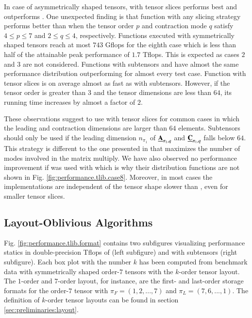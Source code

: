 In case of asymmetrically shaped tensors,  with tensor slices performs best and outperforms .
One unexpected finding is that function  with any slicing strategy performs better than  when the tensor order $p$ and contraction mode $q$ satisfy $4 \leq p \leq 7$ and $2 \leq q \leq 4$, respectively.
Functions executed with symmetrically shaped tensors reach at most $743$ Gflops for the eighth case which is less than half of the attainable peak performance of $1.7$ Tflops.
This is expected as cases $2$ and $3$ are not considered.
Functions  with subtensors and  have almost the same performance distribution outperforming  for almost every test case.
Function  with tensor slices is on average almost as fast as with subtensors.
However, if the tensor order is greater than $3$ and the tensor dimensions are less than $64$, its running time increases by almost a factor of $2$.

These observations suggest to use  with tensor slices for common cases in which the leading and contraction dimensions are larger than $64$ elements.
Subtensors should only be used if the leading dimension $n_{\pi_1}$ of $\underline{\mathbf{A}}_{\pi_1,q}$ and $\underline{\mathbf{C}}_{\pi_1,q}$ falls below $64$.
This strategy is different to the one presented in \cite{li:2015:input} that maximizes the number of modes involved in the matrix multiply.
We have also observed no performance improvement if  was used with  which is why their distribution functions are not shown in Fig. \ref{fig:performance.tlib.case8}.
Moreover, in most cases the  implementations are independent of the tensor shape slower than , even for smaller tensor slices.
\vspace{-1em}

\subsection{Layout-Oblivious Algorithms}
Fig. \ref{fig:performance.tlib.format} contains two subfigures visualizing performance statics in double-precision Tflops of  (left subfigure) and  with subtensors (right subfigure).
Each box plot with the number $k$ has been computed from benchmark data with symmetrically shaped order-$7$ tensors with the $k$-order tensor layout.
The $1$-order and $7$-order layout, for instance, are the first- and last-order storage formats for the order-$7$ tensor with $\pi_F=(1,2,...,7)$ and $\pi_L= (7,6,...,1)$.
The definition of $k$-order tensor layouts can be found in section \ref{sec:preliminaries:layout}.


